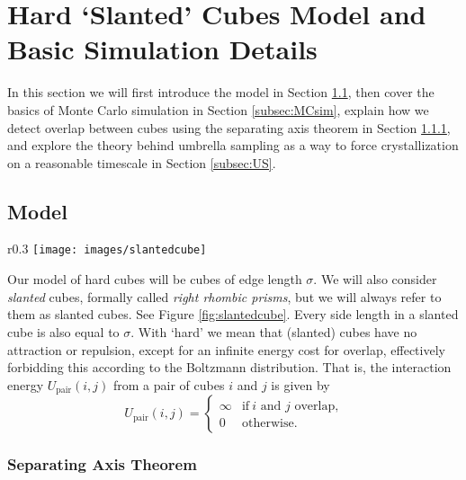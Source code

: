 \documentclass[thesis]{subfiles}
\begin{document}
\section{Hard `Slanted' Cubes Model and Basic Simulation Details}

In this section we will first introduce the model in Section \ref{subsec:model}, then cover the basics of Monte Carlo simulation in Section \ref{subsec:MCsim}, explain how we detect overlap between cubes using the separating axis theorem in Section \ref{subsec:sep ax thm}, and explore the theory behind umbrella sampling as a way to force crystallization on a reasonable timescale in Section \ref{subsec:US}.

\subsection{Model}\label{subsec:model}

\begin{wrapfigure}{r}{0.3\textwidth}
	\centering
	\vspace{-10pt}
	\texttt{[image: images/slantedcube]}
	\caption{A cube with a slant angle $\phi$.}\label{fig:slantedcube}
	\vspace{-15pt}
\end{wrapfigure}

Our model of hard cubes will be cubes of edge length $\sigma$. We will also consider \emph{slanted} cubes, formally called \emph{right rhombic prisms}, but we will always refer to them as slanted cubes. See Figure \ref{fig:slantedcube}. Every side length in a slanted cube is also equal to $\sigma$.
With `hard' we mean that (slanted) cubes have no attraction or repulsion, except for an infinite energy cost for overlap, effectively forbidding this according to the Boltzmann distribution. That is, the interaction energy $U_{\textrm{pair}}(i,j)$ from a pair of cubes $i$ and $j$ is given by
\begin{equation}
U_{\textrm{pair}}(i,j) = 
\begin{cases}
\infty & \text{if}\ i \text{ and } j \text{ overlap,}\\
0 & \text{otherwise.}
\end{cases}
\end{equation}
\subsubsection{Separating Axis Theorem}\label{subsec:sep ax thm}
\end{document}
